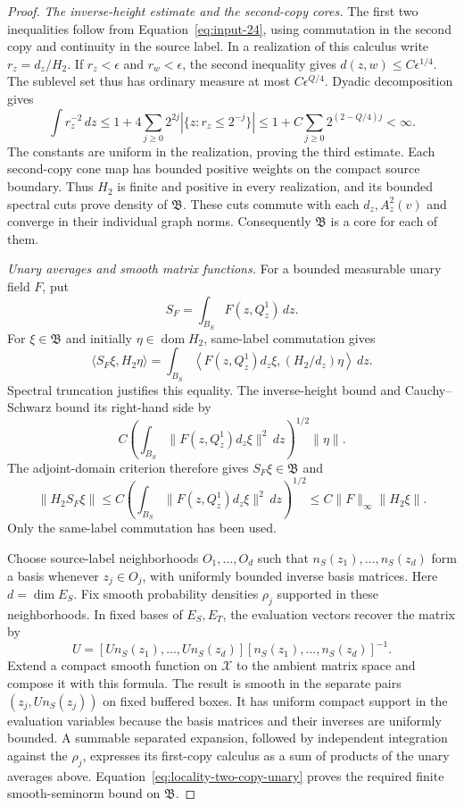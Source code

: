 \begin{proof}
\emph{The inverse-height estimate and the second-copy cores.}
The first two inequalities follow from Equation~\eqref{eq:input-24},
using commutation in the second copy and continuity in the source label.
In a realization of this calculus write $r_z=d_z/H_2$. If
$r_z<\epsilon$ and $r_w<\epsilon$, the second inequality gives
$d(z,w)\le C\epsilon^{1/4}$. The sublevel set thus has ordinary measure
at most $C\epsilon^{Q/4}$. Dyadic decomposition gives
\[
 \int r_z^{-2}\,dz
 \le 1+4\sum_{j\ge0}2^{2j}|\{z:r_z\le2^{-j}\}|
 \le 1+C\sum_{j\ge0}2^{(2-Q/4)j}<\infty.
\]
The constants are uniform in the realization, proving the third estimate.
Each second-copy cone map has bounded positive weights on the compact
source boundary. Thus $H_2$ is finite and positive in every realization,
and its bounded spectral cuts prove density of $\mathfrak B$. These cuts
commute with each $d_z,A_z^2(v)$ and converge in their individual graph
norms. Consequently $\mathfrak B$ is a core for each of them.

\emph{Unary averages and smooth matrix functions.}
For a bounded measurable unary field $F$, put
\[
 S_F=\int_{B_S}F(z,Q_z^1)\,dz.
\]
For $\xi\in\mathfrak B$ and initially $\eta\in\operatorname{dom}H_2$,
same-label commutation gives
\[
 \langle S_F\xi,H_2\eta\rangle
 =\int_{B_S}
 \left\langle F(z,Q_z^1)d_z\xi,(H_2/d_z)\eta\right\rangle\,dz.
\]
Spectral truncation justifies this equality. The inverse-height bound and
Cauchy--Schwarz bound its right-hand side by
\[
 C\left(\int_{B_S}\|F(z,Q_z^1)d_z\xi\|^2\,dz\right)^{1/2}\|\eta\|.
\]
The adjoint-domain criterion therefore gives $S_F\xi\in\mathfrak B$ and
\begin{equation}
 \|H_2S_F\xi\|
 \le C\left(\int_{B_S}\|F(z,Q_z^1)d_z\xi\|^2\,dz\right)^{1/2}
 \le C\|F\|_\infty\|H_2\xi\|.
 \label{eq:locality-two-copy-unary}
\end{equation}
Only the same-label commutation has been used.

Choose source-label neighborhoods $O_1,\ldots,O_d$ such that
$n_S(z_1),\ldots,n_S(z_d)$ form a basis whenever $z_j\in O_j$,
with uniformly bounded inverse basis matrices. Here $d=\dim E_S$.
Fix smooth probability densities $\rho_j$ supported in these neighborhoods.
In fixed bases of $E_S,E_T$, the evaluation vectors recover the matrix by
\[
 U=[U n_S(z_1),\ldots,U n_S(z_d)]
       [n_S(z_1),\ldots,n_S(z_d)]^{-1}.
\]
Extend a compact smooth function on $\mathcal X$ to the ambient matrix
space and compose it with this formula. The result is smooth in the
separate pairs $(z_j,U n_S(z_j))$ on fixed buffered boxes. It has uniform
compact support in the evaluation variables because the basis matrices
and their inverses are uniformly bounded. A summable separated expansion,
followed by independent integration against the $\rho_j$, expresses its
first-copy calculus as a sum of products of the unary averages above.
Equation~\eqref{eq:locality-two-copy-unary} proves the required finite
smooth-seminorm bound on $\mathfrak B$.


\end{proof}
